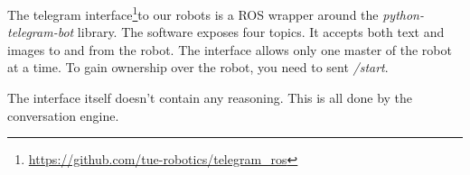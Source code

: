 The telegram interface\footnote{\url{https://github.com/tue-robotics/telegram_ros}}to our robots is a ROS wrapper around the \textit{python-telegram-bot} library. The software exposes four topics. It accepts both text and images to and from the robot. The interface allows only one master of the robot at a time. To gain ownership over the robot, you need to sent \textit{/start}.

The interface itself doesn't contain any reasoning. This is all done by the conversation engine.
